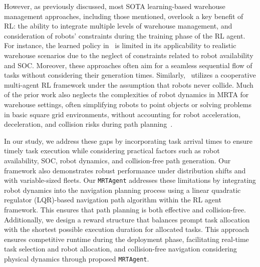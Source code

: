 However, as previously discussed, most SOTA learning-based warehouse management approaches, including those mentioned, overlook a key benefit of RL: the ability to integrate multiple levels of warehouse management, and consideration of robots' constraints during the training phase of the RL agent. For instance, the learned policy in~\cite{agrawal2022dc, agrawal2023rtaw} is limited in its applicability to realistic warehouse scenarios due to the neglect of constraints related to robot availability and SOC. Moreover, these approaches often aim for a seamless sequential flow of tasks without considering their generation times. Similarly,~\cite{papoudakis2021benchmarking} utilizes a cooperative multi-agent RL framework under the assumption that robots never collide. Much of the prior work also neglects the complexities of robot dynamics in MRTA for warehouse settings, often simplifying robots to point objects or solving problems in basic square grid environments, without accounting for robot acceleration, deceleration, and collision risks during path planning~\cite{DBLP:conf/ecai/PalCBO24}. %

In our study, we address these gaps by incorporating task arrival times to ensure timely task execution while considering practical factors such as robot availability, SOC, robot dynamics, and collision-free path generation. Our framework also demonstrates robust performance under distribution shifts and with variable-sized fleets. Our \texttt{MRTAgent} addresses these limitations by integrating robot dynamics into the navigation planning process using a linear quadratic regulator (LQR)-based navigation path algorithm within the RL agent framework. This ensures that path planning is both effective and collision-free.  Additionally, we design a reward structure that balances prompt task allocation with the shortest possible execution duration for allocated tasks. This approach ensures competitive runtime during the deployment phase, facilitating real-time task selection and robot allocation, and collision-free navigation considering physical dynamics through proposed \texttt{MRTAgent}.